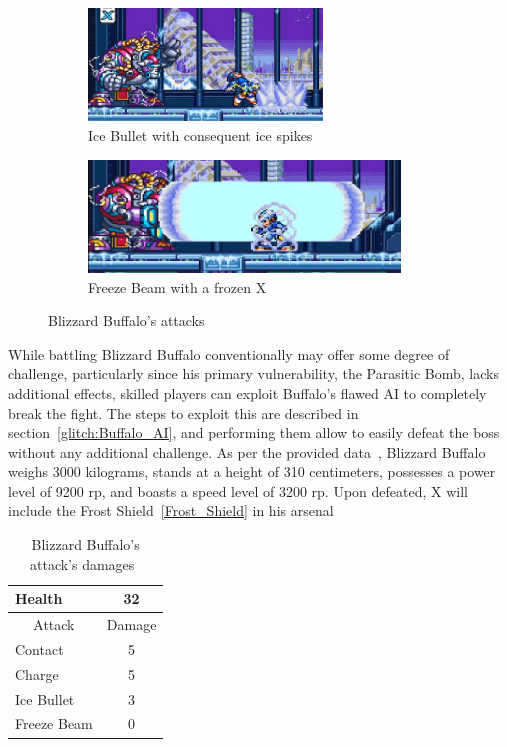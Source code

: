 \begin{figure}[htp]
	\ContinuedFloat
	\centering
	\begin{subfigure}{\linewidth}
		\centering
		\includegraphics[height=3cm]{figures/X3/Blizzard_buffalo/Buffalo_shield.jpg}
		\caption{Ice Bullet with consequent ice spikes}
	\end{subfigure}
	\begin{subfigure}{\linewidth}
		\centering
		\includegraphics[height=3cm]{figures/X3/Blizzard_buffalo/Buffalo_beam.jpg}
		\caption{Freeze Beam with a frozen X}
	\end{subfigure}
	\caption{Blizzard Buffalo's attacks}
\end{figure}
While battling Blizzard Buffalo conventionally may offer some degree of challenge, particularly since his primary vulnerability, the Parasitic Bomb, lacks additional effects, skilled players can exploit Buffalo's flawed AI to completely break the fight. The steps to exploit this  are described in section~\ref{glitch:Buffalo_AI}, and performing them allow to easily defeat the boss without any additional challenge.
As per the provided data~\cite{wayback:X3_resources}, Blizzard Buffalo weighs 3000 kilograms, stands at a height of 310 centimeters, possesses a power level of 9200 rp, and boasts a speed level of 3200 rp. Upon defeated, X will include the Frost Shield~\ref{Frost_Shield} in his arsenal

\begin{table}[htp]
	\centering
	\begin{tabular}[h]{l c}
		\toprule
		Health  & 32\\
		\midrule
		\multicolumn{1}{c}{Attack} & \multicolumn{1}{c}{Damage}\\
		Contact & 5\\
		Charge & 5\\
		Ice Bullet& 3\\
		Freeze Beam& 0\\
		\bottomrule
	\end{tabular}
	\caption{Blizzard Buffalo's attack's damages~\cite{wiki:Blizzard_buffalo,book:Compendium}}
\end{table} 

